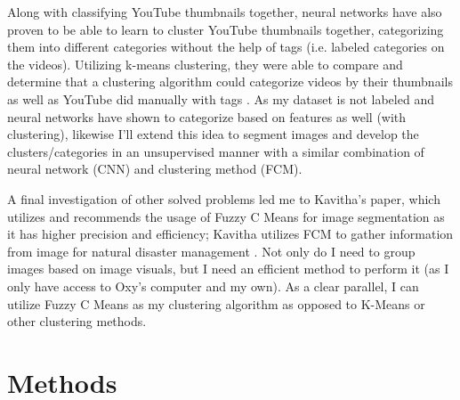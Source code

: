 \documentclass[10pt,twocolumn]{article}
\begin{document}
Along with classifying YouTube thumbnails together, neural networks have also proven to be able to learn to cluster YouTube thumbnails together, categorizing them into different categories without the help of tags (i.e. labeled categories on the videos). Utilizing k-means clustering, they were able to compare and determine that a clustering algorithm could categorize videos by their thumbnails as well as YouTube did manually with tags \cite{Stanford2021}. As my dataset is not labeled and neural networks have shown to categorize based on features as well (with clustering), likewise I'll extend this idea to segment images and develop the clusters/categories in an unsupervised manner with a similar combination of neural network (CNN) and clustering method (FCM).

A final investigation of other solved problems led me to Kavitha's paper, which utilizes and recommends the usage of Fuzzy C Means for image segmentation as it has higher precision and efficiency; Kavitha utilizes FCM to gather information from image for natural disaster management \cite{Kavitha2020}. Not only do I need to group images based on image visuals, but I need an efficient method to perform it (as I only have access to Oxy's computer and my own). As a clear parallel, I can utilize Fuzzy C Means as my clustering algorithm as opposed to K-Means or other clustering methods.


\section {Methods}
\end{document}
